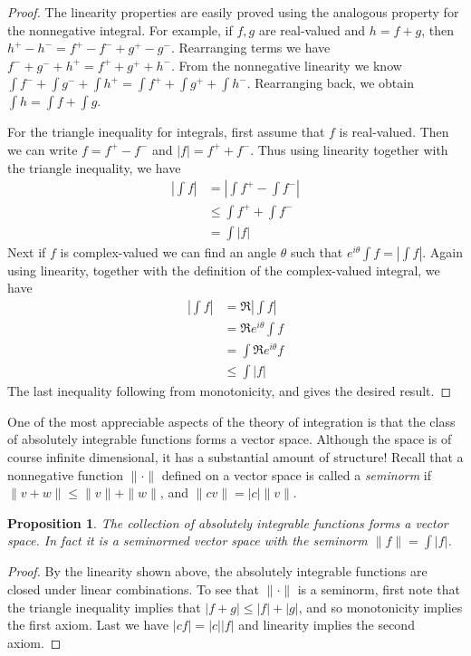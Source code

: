 \documentclass[11pt,oneside]{amsbook}
\theoremstyle{definition}
\theoremstyle{plain}
\newtheorem{prop}[thm]{Proposition}
\theoremstyle{definition}
\theoremstyle{remark}
\numberwithin{equation}{section}
\numberwithin{figure}{section}
\begin{document}
\begin{proof}
  The linearity properties are easily proved using the analogous property for the nonnegative integral. For example, if $f,g$ are real-valued and $h=f+g$, then $h^+-h^-=f^+-f^-+g^+-g^-$. Rearranging terms we have $f^-+g^-+h^+=f^++g^++h^-$. From the nonnegative linearity we know $\int f^-+\int g^-+\int h^+=\int f^++\int g^++\int h^-$. Rearranging back, we obtain $\int h=\int f+\int g$.

  For the triangle inequality for integrals, first assume that $f$ is real-valued. Then we can write $f=f^+-f^-$ and $|f|=f^++f^-$. Thus using linearity together with the triangle inequality, we have
  \begin{align*}
    \left|\int f\right|&=\left|\int f^+-\int f^-\right|\\
                       &\leq\int f^++\int f^-\\
                       &=\int|f|
  \end{align*}
  Next if $f$ is complex-valued we can find an angle $\theta$ such that $e^{i\theta}\int f=\left|\int f\right|$. Again using linearity, together with the definition of the complex-valued integral, we have
  \begin{align*}
    \left|\int f\right|&=\Re\left|\int f\right|\\
                       &=\Re e^{i\theta}\int f\\
                       &=\int \Re e^{i\theta}f\\
                       &\leq\int|f|
  \end{align*}
  The last inequality following from monotonicity, and gives the desired result.
\end{proof}

One of the most appreciable aspects of the theory of integration is that the class of absolutely integrable functions forms a vector space. Although the space is of course infinite dimensional, it has a substantial amount of structure! Recall that a nonnegative function $\|\cdot\|$ defined on a vector space is called a \emph{seminorm} if $\|v+w\|\leq\|v\|+\|w\|$, and $\|cv\|=|c|\|v\|$.

\begin{prop}
  The collection of absolutely integrable functions forms a vector space. In fact it is a seminormed vector space with the seminorm $\|f\|=\int|f|$.
\end{prop}

\begin{proof}
  By the linearity shown above, the absolutely integrable functions are closed under linear combinations. To see that $\|\cdot\|$ is a seminorm, first note that the triangle inequality implies that $|f+g|\leq|f|+|g|$, and so monotonicity implies the first axiom. Last we have $|cf|=|c||f|$ and linearity implies the second axiom.
\end{proof}
\end{document}
